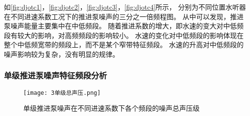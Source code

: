如\autoref{fig:djotc1}，\autoref{fig:djotc2}，\autoref{fig:djotc3}，\autoref{fig:djotc4}所示，
分别为不同位置水听器在不同进速系数工况下的推进泵噪声的三分之一倍频程图。
从中可以发现，推进泵噪声能量主要集中在中低频段。
随着推进系数的增大，即水速的变大对中低频段有较大的影响，对高频频段的影响较小。
水速的变化对中低频段的影响体现在整个中低频宽带的频段上，而不是某个窄带特征频段。
水速的升高对中低频段的噪声影响较为复杂，没有明显的规律。
\begin{comment}
\begin{figure}[htbp]
        \centering
        \subfigure[pic1.]{
        \texttt{[image: 3dj2\_otc.png]}
        }
\end{figure}
\addtocounter{figure}{-1}
\begin{figure}[htbp]
        \centering
        \addtocounter{figure}{1} 
        \subfigure[pic2.]{
        \texttt{[image: 3dj7\_otc.png]}
        }
\end{figure}
\addtocounter{figure}{-1}
\begin{figure}[htbp]
        \centering
        \addtocounter{figure}{1} 
        \vspace{0.02cm}
        \subfigure[pic2.]{
        \texttt{[image: 3dj6\_otc.png]}
        }
\end{figure}
\addtocounter{figure}{-1}
\begin{figure}[htbp]
        \centering
        \addtocounter{figure}{1} 
        \vspace{0.02cm}
        \subfigure[pic2.]{
        \texttt{[image: 3dj3\_otc.png]}
        }
        \caption{\label{fig:dj_modle}不同进速系数下单级推进泵水下噪声三分之一倍频程图}
\end{figure}
\end{comment}
\subsubsection{单级推进泵噪声特征频段分析}
\begin{figure}[htbp]
    \centering
    \texttt{[image: 3单级总声压.png]}
    \caption{\label{fig:djtotal}单级推进泵噪声在不同进速系数下各个频段的噪声总声压级}
\end{figure}

